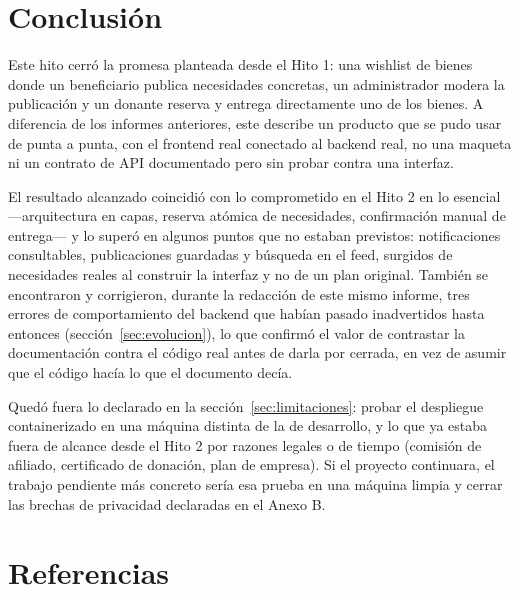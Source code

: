 \documentclass[11pt,letterpaper]{article}
\begin{document}
\section{Conclusión}

Este hito cerró la promesa planteada desde el Hito 1: una wishlist de bienes donde un beneficiario publica necesidades concretas, un administrador modera la publicación y un donante reserva y entrega directamente uno de los bienes. A diferencia de los informes anteriores, este describe un producto que se pudo usar de punta a punta, con el frontend real conectado al backend real, no una maqueta ni un contrato de API documentado pero sin probar contra una interfaz.

El resultado alcanzado coincidió con lo comprometido en el Hito 2 en lo esencial —arquitectura en capas, reserva atómica de necesidades, confirmación manual de entrega— y lo superó en algunos puntos que no estaban previstos: notificaciones consultables, publicaciones guardadas y búsqueda en el feed, surgidos de necesidades reales al construir la interfaz y no de un plan original. También se encontraron y corrigieron, durante la redacción de este mismo informe, tres errores de comportamiento del backend que habían pasado inadvertidos hasta entonces (sección~\ref{sec:evolucion}), lo que confirmó el valor de contrastar la documentación contra el código real antes de darla por cerrada, en vez de asumir que el código hacía lo que el documento decía.

Quedó fuera lo declarado en la sección~\ref{sec:limitaciones}: probar el despliegue containerizado en una máquina distinta de la de desarrollo, y lo que ya estaba fuera de alcance desde el Hito 2 por razones legales o de tiempo (comisión de afiliado, certificado de donación, plan de empresa). Si el proyecto continuara, el trabajo pendiente más concreto sería esa prueba en una máquina limpia y cerrar las brechas de privacidad declaradas en el Anexo B.

\section{Referencias}
\end{document}

